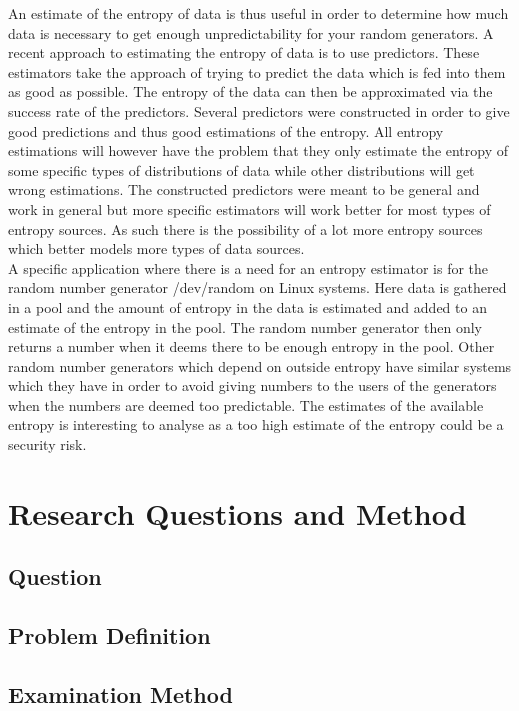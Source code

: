 \documentclass[a4paper,11pt]{report}
\begin{document}
\noindent
An estimate of the entropy of data is thus useful in order to determine
how much data is necessary to get enough unpredictability for your random
generators. A recent approach to estimating the entropy of data is to use 
predictors. These estimators take the approach of trying to predict the data
which is fed into them as good as possible. The entropy of the data can then
be approximated via the success rate of the predictors. Several predictors were
constructed in order to give good predictions and thus good estimations of the 
entropy. All entropy estimations will however have the problem that they only
estimate the entropy of some specific types of distributions of data while 
other distributions will get wrong estimations. The constructed predictors were 
meant to be general and work in general but more specific estimators will work
better for most types of entropy sources. As such there is the possibility of
a lot more entropy sources which better models more types of data sources. \\

\noindent
A specific application where there is a need for an entropy estimator is for
the random number generator /dev/random on Linux systems. Here data is 
gathered in a pool and the amount of entropy in the data is estimated 
and added to an estimate of the entropy in the pool\cite{/dev/random}. The random number 
generator then only returns a number when it deems there to be enough entropy
in the pool. Other random number generators which depend on outside entropy 
have similar systems which they have in order to avoid giving numbers to 
the users of the generators when the numbers are deemed too predictable.
The estimates of the available entropy is interesting to analyse as a 
too high estimate of the entropy could be a security risk.
\section*{Research Questions and Method}
\subsection*{Question}
\subsection*{Problem Definition}
\subsection*{Examination Method}
\end{document}
